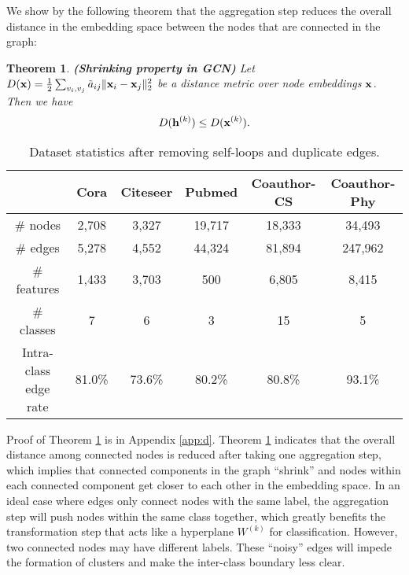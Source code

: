 \documentclass{article}
\newtheorem{theorem}{Theorem}
\begin{document}
		We show by the following theorem that the aggregation step reduces the overall distance in the embedding space between the nodes that are connected in the graph:
		\begin{theorem}
		\label{thm:decrease}
			\rm\textbf{(Shrinking property in GCN)}
			Let $D({\bf x}) = \frac{1}{2} \sum_{v_i, v_j} \tilde a_{ij} \| {\bf x}_i - {\bf x}_j \|_2^2$ be a distance metric over node embeddings ${\bf x}$.
Then we have
			\begin{equation*}
				D({\bf h}^{(k)}) \leq D({\bf x}^{(k)}).
			\end{equation*}
		\end{theorem}
		
		\begin{table*}[t]
			\centering
			\setlength{\tabcolsep}{12pt}
			\begin{tabular}{c|ccccc}
				\hline
				& \textbf{Cora} & \textbf{Citeseer} & \textbf{Pubmed} & \textbf{Coauthor-CS} & \textbf{Coauthor-Phy} \\
				\hline
				\# nodes & 2,708 & 3,327 & 19,717 & 18,333 & 34,493 \\
				\# edges & 5,278 & 4,552 & 44,324 & 81,894 & 247,962 \\
				\# features & 1,433 & 3,703 & 500 & 6,805 & 8,415 \\
				\# classes & 7 & 6 & 3 & 15 & 5 \\
				Intra-class edge rate & 81.0\% & 73.6\% & 80.2\% & 80.8\% & 93.1\% \\
				\hline
			\end{tabular}
			\caption{Dataset statistics after removing self-loops and duplicate edges.}
			\label{table:statistics}
		\end{table*}
	
		Proof of Theorem \ref{thm:decrease} is in Appendix \ref{app:d}.
		Theorem \ref{thm:decrease} indicates that the overall distance among connected nodes is reduced after taking one aggregation step, which implies that connected components in the graph ``shrink'' and nodes within each connected component get closer to each other in the embedding space.
		In an ideal case where edges only connect nodes with the same label, the aggregation step will push nodes within the same class together, which greatly benefits the transformation step that acts like a hyperplane $W^{(k)}$ for classification.
		However, two connected nodes may have different labels.
		These ``noisy'' edges will impede the formation of clusters and make the inter-class boundary less clear.
\end{document}
